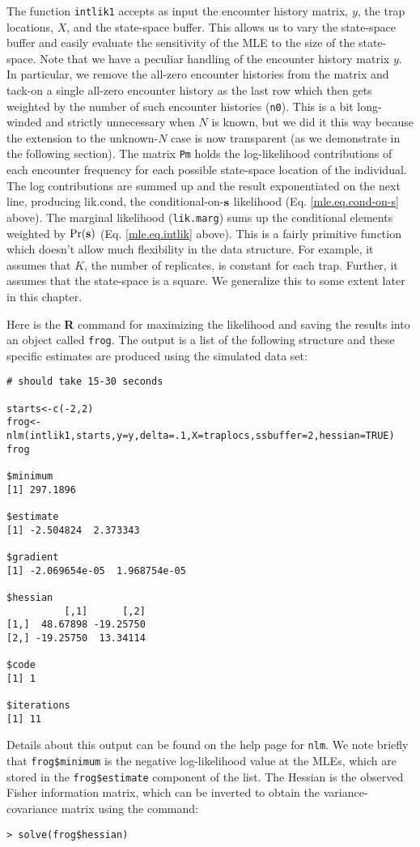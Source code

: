 The function \mbox{\tt intlik1} accepts as input the encounter history matrix, $y$, the
trap locations, $X$, and the state-space buffer. This allows us to
vary the state-space buffer and easily evaluate the sensitivity of the
MLE to the size of the state-space.  Note that we have a peculiar
handling of the encounter history matrix $y$. In particular, we remove
the all-zero encounter histories from the matrix and tack-on a single
all-zero encounter history as the last row which then gets weighted by
the number of such encounter histories (\mbox{\tt n0}). This is a bit
long-winded and strictly unnecessary when $N$ is known, but we did it
this way because the extension to the unknown-$N$ case is now
transparent (as we demonstrate in the following section).  The matrix
\mbox{\tt Pm} holds the log-likelihood contributions of each encounter
frequency for each possible state-space location of the individual.
The log contributions are summed up and the result exponentiated on
the next line, producing lik.cond, the conditional-on-${\bf s}$
likelihood (Eq. \ref{mle.eq.cond-on-s} above). The marginal likelihood
(\mbox{\tt lik.marg}) sums up the conditional elements weighted by
$\Pr({\bf s})$ (Eq. \ref{mle.eq.intlik} above).  This is a fairly
primitive function which doesn't allow much flexibility in the data
structure. For example, it assumes that $K$, the number of replicates,
is constant for each trap. Further, it assumes that the state-space is
a square. We generalize this to some extent later in this chapter.

Here is the {\bf R} command for maximizing the likelihood and saving the
results into an object called \mbox{\tt frog}.  The output is a list of the
following structure and these specific estimates are produced using
the simulated data set:

{\small 
\begin{verbatim}
# should take 15-30 seconds

starts<-c(-2,2)
frog<-nlm(intlik1,starts,y=y,delta=.1,X=traplocs,ssbuffer=2,hessian=TRUE)
frog

$minimum
[1] 297.1896

$estimate
[1] -2.504824  2.373343

$gradient
[1] -2.069654e-05  1.968754e-05

$hessian
          [,1]      [,2]
[1,]  48.67898 -19.25750
[2,] -19.25750  13.34114

$code
[1] 1

$iterations
[1] 11
\end{verbatim}
} 
Details about this output can be found on the help page for
\mbox{\tt nlm}. We note briefly that \mbox{\tt frog\$minimum} is the
negative log-likelihood value at the MLEs, which are stored in the
\mbox{\tt frog\$estimate} component of the list. The Hessian is the
observed Fisher information matrix, which can be inverted to obtain
the variance-covariance matrix using the command:
\begin{verbatim}
> solve(frog$hessian)
\end{verbatim}

